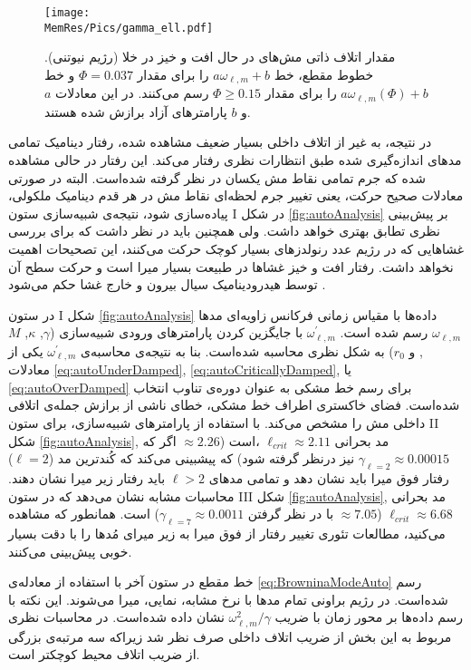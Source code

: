 \begin{figure}[h]
\begin{center}
\texttt{[image: \\MemRes/Pics/gamma\_ell.pdf]}
\caption{
مقدار اتلاف ذاتی مش‌های در حال افت و خیز در خلا (رژیم نیوتنی)‌. خطوط مقطع،‌ خط
$a\omega_{\ell,m}+b$
را برای مقدار
$\Phi=0.037$
و خط
$a\omega_{\ell,m}(\Phi)+b$
را برای مقدار 
$\Phi\geq0.15$
رسم می‌کنند. در این معادلات 
$a$
و
$b$
پارامتر‌های آزاد برازش شده هستند.
}
\label{fig:gammaEll}
\end{center}
\end{figure}

در نتیجه، به غیر از اتلاف داخلی بسیار ضعیف مشاهده  شده، رفتار دینامیک تمامی مد‌های اندازه‌گیری شده طبق انتظارات نظری رفتار می‌کند. این رفتار در حالی مشاهده شده که جرم تمامی‌ نقاط مش یکسان در نظر گرفته شده‌است. البته در صورتی معادلات صحیح حرکت، یعنی تغییر جرم لحظه‌ای نقاط مش در هر قدم دینامیک ملکولی، پیاده‌سازی شود، نتیجه‌ی شبیه‌سازی ستون
I
در شکل
\ref{fig:autoAnalysis}
بر پیش‌بینی نظری تطابق بهتری خواهد داشت. ولی همچنین باید در نظر داشت که برای بررسی غشا‌هایی که در رژیم عدد رنولدز‌های بسیار کوچک حرکت می‌کنند، این تصحیحات اهمیت نخواهد داشت. رفتار افت و خیز غشا‌ها در طبیعت بسیار میرا است و حرکت سطح آن توسط هیدرودینامیک سیال بیرون و خارج غشا حکم می‌شود
\cite{schneider1984, milnersafranPRA1987}
.

در ستون
I
شکل
 \ref{fig:autoAnalysis}
داده‌ها با مقیاس زمانی فرکانس زاویه‌ای مد‌ها
$\omega_{\ell,m}$
رسم شده است. 
$\omega_{\ell,m}^\prime$
با جایگزین کردن پارامتر‌های ورودی شبیه‌سازی 
($\gamma$, $\kappa$, $M$,
 و
$r_0$)
به شکل نظری محاسبه‌ شده‌است. بنا به نتیجه‌ی محاسبه‌ی 
$\omega_{\ell,m}^\prime$
یکی از معادلات
\ref{eq:autoUnderDamped}, \ref{eq:autoCriticallyDamped},
 یا
\ref{eq:autoOverDamped}
برای رسم خط مشکی به عنوان دوره‌ی تناوب انتخاب شده‌است. فضای خاکستری اطراف خط مشکی، خطای ناشی از برازش جمله‌ی اتلافی داخلی مش را مشخص می‌کند. با استفاده از پارامتر‌های شبیه‌سازی، برای ستون
II
شکل 
 \ref{fig:autoAnalysis},
مد بحرانی
$\ell_{crit}\approx 2.11$ 
،است
($\approx2.26$
اگر که 
$\gamma_{\ell=2}\approx0.00015$
نیز درنظر گرفته شود) که پیشبینی می‌کند که کُند‌ترین مد 
($\ell=2$)
رفتار فوق میرا باید نشان دهد و تمامی مد‌های
$\ell>2$
باید رفتار زیر میرا نشان دهند. محاسبات مشابه نشان می‌دهد که در ستون
III
شکل
 \ref{fig:autoAnalysis},
 مد بحرانی
$\ell_{crit}\approx 6.68$ ($\approx 7.05$
با در نظر گرفتن
$\gamma_{\ell=7}\approx0.0011$)
است. همانطور که مشاهده می‌کنید، مطالعات تئوری تغییر رفتار از فوق میرا به زیر میرای مُدها را با دقت بسیار خوبی پیش‌بینی می‌کنند. 

خط مقطع در ستون آخر با استفاده از معادله‌ی
\ref{eq:BrowninaModeAuto}
رسم شده‌است. در رژیم براونی تمام مد‌ها با نرخ مشابه، نمایی، میرا می‌شوند. این نکته با رسم داده‌ها بر محور زمان با ضریب
$\omega_{\ell,m}^2/\gamma$
نشان داده شده‌است. در محاسبات نظری مربوط به این بخش از ضریب اتلاف داخلی صرف نظر شد زیراکه سه مرتبه‌ی بزرگی از ضریب اتلاف محیط کوچکتر است.

